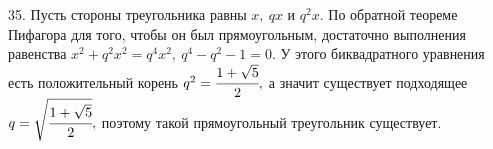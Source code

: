 35. Пусть стороны треугольника равны $x,\ qx$ и $q^2x.$ По обратной теореме Пифагора для того, чтобы он был прямоугольным, достаточно выполнения равенства
$x^2+q^2x^2=q^4x^2,\ q^4-q^2-1=0.$ У этого биквадратного уравнения есть положительный корень $q^2=\cfrac{1+\sqrt{5}}{2},$ а значит существует подходящее $q=\sqrt{\cfrac{1+\sqrt{5}}{2}},$ поэтому такой прямоугольный треугольник существует.\\
